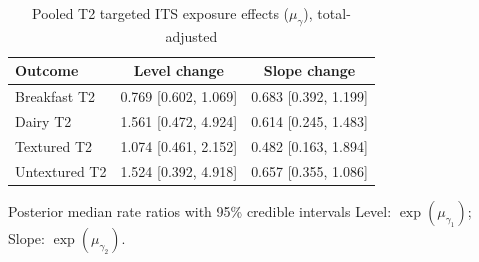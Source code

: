 \begin{table}[H]
\centering
\caption{Pooled T2 targeted ITS exposure effects ($\mu_\gamma$), total-adjusted}
\label{tab:a4_t2_mu_gamma_adj}
\begin{tabular}{lcc}
\toprule
Outcome & Level change & Slope change \\
\midrule
Breakfast T2 & 0.769 [0.602, 1.069] & 0.683 [0.392, 1.199] \\
Dairy T2 & 1.561 [0.472, 4.924] & 0.614 [0.245, 1.483] \\
Textured T2 & 1.074 [0.461, 2.152] & 0.482 [0.163, 1.894] \\
Untextured T2 & 1.524 [0.392, 4.918] & 0.657 [0.355, 1.086] \\
\bottomrule
\end{tabular}
\par\smallskip\footnotesize Posterior median rate ratios with 95\% credible intervals Level: $\exp(\mu_{\gamma_1})$; Slope: $\exp(\mu_{\gamma_2})$.
\end{table}
